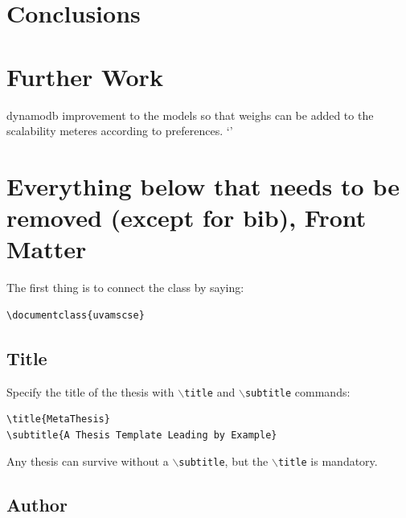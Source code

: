 \documentclass{uvamscse}
\newcommand{\cmd}[1]{\texttt{$\backslash$#1}}
\begin{document}
\chapter{Conclusions}\label{Conclusions}

\chapter{Further Work}\label{Further Work}
dynamodb
improvement to the models so that weighs can be added to the scalability meteres according to preferences.
`'
\chapter{Everything below that needs to be removed (except for bib), Front Matter}

The first thing is to connect the class by saying:

\begin{snippet}
\begin{verbatim}
\documentclass{uvamscse}
\end{verbatim}
\end{snippet}

\section{Title}

Specify the title of the thesis with \cmd{title} and \cmd{subtitle} commands:

\begin{snippet}
\begin{verbatim}
\title{MetaThesis}
\subtitle{A Thesis Template Leading by Example}
\end{verbatim}
\end{snippet}

Any thesis can survive without a \cmd{subtitle}, but the \cmd{title} is mandatory.

\section{Author}
\end{document}
